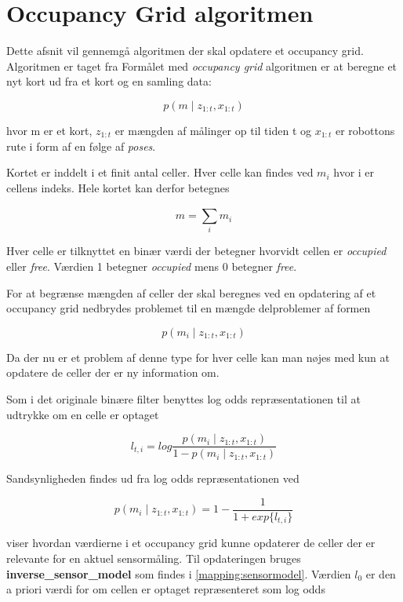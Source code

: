 \section{Occupancy Grid algoritmen}
Dette afsnit vil gennemgå algoritmen der skal opdatere et occupancy grid.
Algoritmen er taget fra \cite[p.~xxx]{probabilisticRobotics}
Formålet med \textit{occupancy grid} algoritmen er at beregne	et nyt kort ud fra et kort og en samling data:

\[ p(m \mid z_{1:t}, x_{1:t}) \]

hvor m er et kort, $ z_{1:t} $ er mængden af målinger op til tiden t og $ x_{1:t} $ er robottons rute i form af en følge af \textit{poses}.

Kortet er inddelt i et finit antal celler.
Hver celle kan findes ved $ m_i $ hvor i er cellens indeks. 
Hele kortet kan derfor betegnes

\[  m = \sum_{i}^{} m_i \]

Hver celle er tilknyttet en binær værdi der betegner hvorvidt cellen er \textit{occupied} eller \textit{free}.
Værdien 1 betegner \textit{occupied} mens 0 betegner \textit{free}.

For at begrænse mængden af celler der skal beregnes ved en opdatering af et occupancy grid nedbrydes problemet til en mængde delproblemer af formen

\[ p(m_i \mid z_{1:t}, x_{1:t}) \]

Da der nu er et problem af denne type for hver celle kan man nøjes med kun at opdatere de celler der er ny information om.

Som i det originale binære filter  benyttes log odds repræsentationen til at udtrykke om en celle er optaget

\[ l_{t,i} = log{ \frac{p(m_i \mid z_{1:t}, x_{1:t})}{1 - p(m_i \mid z_{1:t}, x_{1:t})}} \]

Sandsynligheden findes ud fra log odds repræsentationen ved

\[ p(m_i \mid z_{1:t}, x_{1:t}) = 1 - \frac{1}{1 + exp \{ l_{t,i} \} } \]

 viser hvordan værdierne i et occupancy grid kunne opdaterer de celler der er relevante for en aktuel sensormåling. 
Til opdateringen bruges \textbf{inverse\_sensor\_model} som findes i \cref{mapping:sensormodel}. 
Værdien $ l_0 $ er den a priori værdi for om cellen er optaget repræsenteret som log odds

